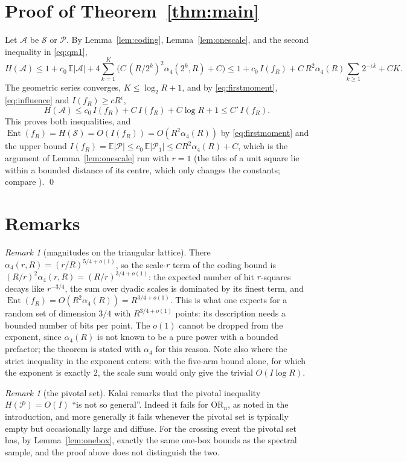 \documentclass[11pt]{amsart}
\theoremstyle{remark}
\newtheorem{remark}[theorem]{Remark}
\newcommand{\Ent}{\operatorname{Ent}}
\newcommand{\EE}{\mathbb{E}}
\newcommand{\Sc}{\mathcal{S}}
\newcommand{\Pc}{\mathcal{P}}
\begin{document}
\section{Proof of Theorem~\ref{thm:main}}

Let $\mathcal A$ be $\Sc$ or $\Pc$. By Lemma~\ref{lem:coding}, Lemma~\ref{lem:onescale}, and the second inequality in \eqref{eq:qm1},
\[
H(\mathcal A)\le 1+c_0\,\EE|\mathcal A|+4\sum_{k=1}^{K}\Big(C\,(R/2^k)^2\alpha_4(2^k,R)+C\Big)
\le 1+c_0\,I(f_R)+C\,R^2\alpha_4(R)\sum_{k\ge1}2^{-\epsilon k}+CK.
\]
The geometric series converges, $K\le\log_2R+1$, and by \eqref{eq:firstmoment}, \eqref{eq:influence} and $I(f_R)\ge cR^{\epsilon}$,
\[
H(\mathcal A)\le c_0\,I(f_R)+C\,I(f_R)+C\log R+1\le C'\,I(f_R).
\]
This proves both inequalities, and $\Ent(f_R)=H(\Sc)=O(I(f_R))=O(R^2\alpha_4(R))$ by \eqref{eq:firstmoment} and the upper bound $I(f_R)=\EE|\Pc|\le c_0\,\EE|\Pc_1|\le CR^2\alpha_4(R)+C$, which is the argument of Lemma~\ref{lem:onescale} run with $r=1$ (the tiles of a unit square lie within a bounded distance of its centre, which only changes the constants; compare \cite[Section~3]{GPS10}). \qed

\section{Remarks}

\begin{remark}[magnitudes on the triangular lattice]
There $\alpha_4(r,R)=(r/R)^{5/4+o(1)}$, so the scale-$r$ term of the coding bound is $(R/r)^2\alpha_4(r,R)=(R/r)^{3/4+o(1)}$: the expected number of hit $r$-squares decays like $r^{-3/4}$, the sum over dyadic scales is dominated by its finest term, and $\Ent(f_R)=O(R^2\alpha_4(R))=R^{3/4+o(1)}$. This is what one expects for a random set of dimension $3/4$ with $R^{3/4+o(1)}$ points: its description needs a bounded number of bits per point. The $o(1)$ cannot be dropped from the exponent, since $\alpha_4(R)$ is not known to be a pure power with a bounded prefactor; the theorem is stated with $\alpha_4$ for this reason. Note also where the strict inequality in the exponent enters: with the five-arm bound alone, for which the exponent is exactly $2$, the scale sum would only give the trivial $O(I\log R)$.
\end{remark}

\begin{remark}[the pivotal set]
Kalai remarks that the pivotal inequality $H(\Pc)=O(I)$ ``is not so general''. Indeed it fails for $\mathrm{OR}_n$, as noted in the introduction, and more generally it fails whenever the pivotal set is typically empty but occasionally large and diffuse. For the crossing event the pivotal set has, by Lemma~\ref{lem:onebox}, exactly the same one-box bounds as the spectral sample, and the proof above does not distinguish the two.
\end{remark}
\end{document}
